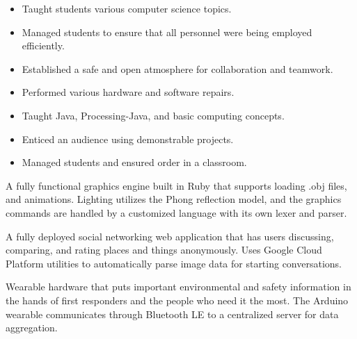 \documentclass[10pt,a4paper,ragged2e,withhyper]{altacv}
\begin{document}
\begin{paracol}{2}
\divider{}

\begin{itemize}
\item Taught students various computer science topics.
\item Managed students to ensure that all personnel were being employed efficiently.
\item Established a safe and open atmosphere for collaboration and teamwork.
\item Performed various hardware and software repairs.
\end{itemize}


\begin{itemize}
\item Taught Java, Processing-Java, and basic computing concepts.
\item Enticed an audience using demonstrable projects.
\item Managed students and ensured order in a classroom.
\end{itemize}


\small

\small{}A fully functional graphics engine built in Ruby that supports loading .obj files, and animations.
Lighting utilizes the Phong reflection model, and the graphics commands are handled by a customized language with its own lexer and parser.

\divider{}

\small{}A fully deployed social networking web application that has users discussing, comparing, and rating places and things anonymously.
Uses Google Cloud Platform utilities to automatically parse image data for starting conversations.

\divider{}

\small{}Wearable hardware that puts important environmental and safety information in the hands of first responders and the people who need it the most.
The Arduino wearable communicates through Bluetooth LE to a centralized server for data aggregation.


\end{paracol}
\end{document}
